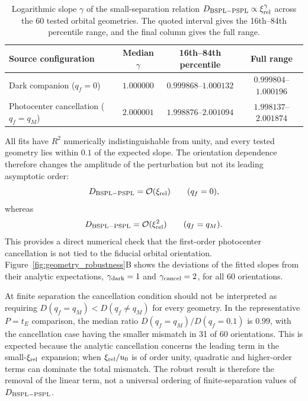 \documentclass{article}
\begin{document}
\begin{table}[H]
\centering
\caption{
Logarithmic slope $\gamma$ of the small-separation relation
$D_{\rm BSPL-PSPL}\propto\xi_{\rm rel}^{\gamma}$ across the 60 tested
orbital geometries. The quoted interval gives the 16th--84th percentile
range, and the final column gives the full range.
}
\label{tab:geometry_slopes}
\begin{tabular}{lccc}
\toprule
Source configuration &
Median $\gamma$ &
16th--84th percentile &
Full range \\
\midrule
Dark companion ($q_f=0$) &
$1.000000$ &
$0.999868$--$1.000132$ &
$0.999804$--$1.000196$ \\
Photocenter cancellation ($q_f=q_M$) &
$2.000001$ &
$1.998876$--$2.001094$ &
$1.998137$--$2.001874$ \\
\bottomrule
\end{tabular}
\end{table}

All fits have $R^2$ numerically indistinguishable from unity, and every
tested geometry lies within $0.1$ of the expected slope. The
orientation dependence therefore changes the amplitude of the
perturbation but not its leading asymptotic order:
\begin{equation}
D_{\rm BSPL-PSPL}=\mathcal{O}(\xi_{\rm rel})
\qquad (q_f=0),
\end{equation}
whereas
\begin{equation}
D_{\rm BSPL-PSPL}=\mathcal{O}(\xi_{\rm rel}^2)
\qquad (q_f=q_M).
\end{equation}
This provides a direct numerical check that the first-order
photocenter cancellation is not tied to the fiducial orbital
orientation. Figure~\ref{fig:geometry_robustness}B shows the deviations
of the fitted slopes from their analytic expectations,
$\gamma_{\rm dark}=1$ and $\gamma_{\rm cancel}=2$, for all 60
orientations.

At finite separation the cancellation condition should not be
interpreted as requiring
$D(q_f=q_M)<D(q_f\neq q_M)$ for every geometry. In the representative
$P=t_E$ comparison, the median ratio
$D(q_f=q_M)/D(q_f=0.1)$ is $0.99$, with the cancellation case having
the smaller mismatch in 31 of 60 orientations. This is expected because
the analytic cancellation concerns the leading term in the
small-$\xi_{\rm rel}$ expansion; when $\xi_{\rm rel}/u_0$ is of order
unity, quadratic and higher-order terms can dominate the total
mismatch. The robust result is therefore the removal of the linear term,
not a universal ordering of finite-separation values of
$D_{\rm BSPL-PSPL}$.
\end{document}
